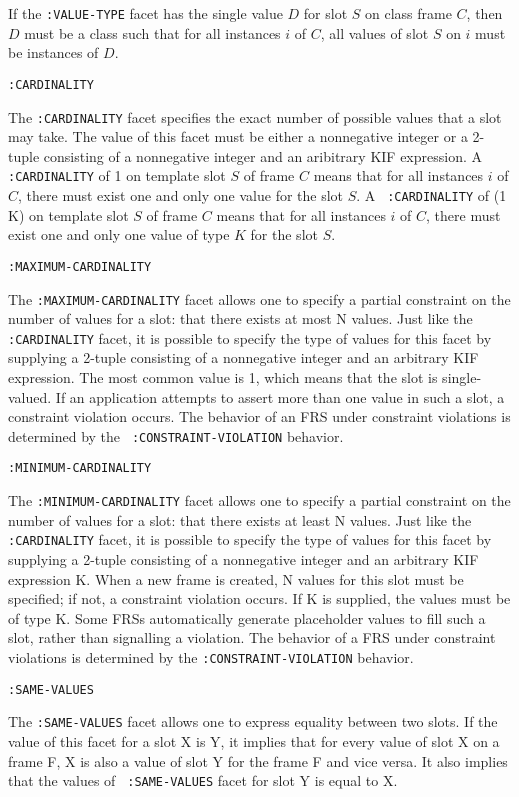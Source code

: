If the {\tt :VALUE-TYPE} facet has the single value $D$ for slot $S$
on class frame $C$, then $D$ must be a class such that for all
instances $i$ of $C$, all values of slot $S$ on $i$ must be instances
of $D$.

{\tt :CARDINALITY}

The {\tt :CARDINALITY} facet specifies the exact number of possible
values that a slot may take.  The value of this facet must be either a
nonnegative integer or a 2-tuple consisting of a nonnegative integer
and an aribitrary KIF expression.  A {\tt :CARDINALITY} of 1 on
template slot $S$ of frame $C$ means that for all instances $i$ of
$C$, there must exist one and only one value for the slot $S$.  A {\tt
:CARDINALITY} of (1 K) on template slot $S$ of frame $C$ means that
for all instances $i$ of $C$, there must exist one and only one value
of type $K$ for the slot $S$.


{\tt :MAXIMUM-CARDINALITY}

The {\tt :MAXIMUM-CARDINALITY} facet allows one to specify a partial
constraint on the number of values for a slot: that there exists at
most N values.  Just like the {\tt :CARDINALITY} facet, it is possible
to specify the type of values for this facet by supplying a 2-tuple
consisting of a nonnegative integer and an arbitrary KIF expression.
The most common value is 1, which means that the slot is
single-valued.  If an application attempts to assert more than one
value in such a slot, a constraint violation occurs. The behavior of
an FRS under constraint violations is determined by the {\tt
:CONSTRAINT-VIOLATION} behavior.

{\tt :MINIMUM-CARDINALITY}

The {\tt :MINIMUM-CARDINALITY} facet allows one to specify a partial
constraint on the number of values for a slot: that there exists at
least N values.  Just like the {\tt :CARDINALITY} facet, it is
possible to specify the type of values for this facet by supplying a
2-tuple consisting of a nonnegative integer and an arbitrary KIF
expression K.  When a new frame is created, N values for this slot
must be specified; if not, a constraint violation occurs. If K is
supplied, the values must be of type K.  Some FRSs automatically
generate placeholder values to fill such a slot, rather than
signalling a violation. The behavior of a FRS under constraint
violations is determined by the {\tt :CONSTRAINT-VIOLATION} behavior.

{\tt :SAME-VALUES}

The {\tt :SAME-VALUES} facet allows one to express equality between
two slots.  If the value of this facet for a slot X is Y, it implies
that for every value of slot X on a frame F, X is also a value of slot
Y for the frame F and vice versa.  It also implies that the values of {\tt
:SAME-VALUES} facet for slot Y is equal to X.

